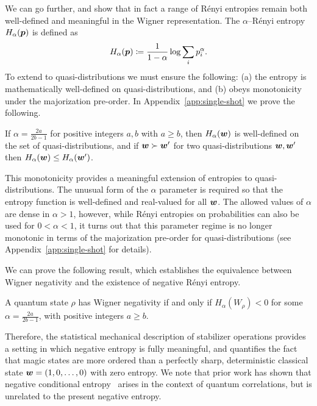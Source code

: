 \documentclass[pra,
aps,
twocolumn,
superscriptaddress,
groupedaddress,
nofootinbib,
reprint
]{revtex4-1}
\begin{document}
We can go further, and show that in fact a range of R\'{e}nyi entropies remain both well-defined and meaningful in the Wigner representation. The $\alpha$--R\'{e}nyi entropy $H_\alpha(\boldsymbol{p})$ is defined as~\cite{renyi_1960}
\begin{equation}
	H_\alpha(\boldsymbol{p}) \coloneqq \frac{1}{1-\alpha} \log \sum_i p_i^\alpha.
\end{equation}
To extend to quasi-distributions we must ensure the following: (a) the entropy is mathematically well-defined on quasi-distributions, and (b) obeys monotonicity under the majorization pre-order. In Appendix~\ref{app:single-shot} we prove the following.
\begin{theorem}\label{thm:HSchur} 
	If $\alpha = \frac{2a}{2b-1}$ for positive integers $a,b$ with $a \geq b$, then $H_\alpha(\boldsymbol{w})$ is well-defined on the set of quasi-distributions, and if $\boldsymbol{w} \succ \boldsymbol{w}'$ for two quasi-distributions $\boldsymbol{w}, \boldsymbol{w}'$ then $H_\alpha (\boldsymbol{w}) \leq H_\alpha(\boldsymbol{w}')$.
\end{theorem}
This monotonicity provides a meaningful extension of entropies to quasi-distributions. The unusual form of the $\alpha$ parameter is required so that the entropy function is well-defined and real-valued for all $\boldsymbol{w}$. The allowed values of $\alpha$ are dense in $\alpha >1$, however, while R\'{e}nyi entropies on probabilities can also be used for $0 < \alpha <1$, it turns out that this parameter regime is no longer monotonic in terms of the majorization pre-order for quasi-distributions (see Appendix~\ref{app:single-shot} for details).

We can prove the following result, which establishes the equivalence between Wigner negativity and the existence of negative R\'{e}nyi entropy.
\begin{theorem}\label{thm:Magic}
	A quantum state $\rho$ has Wigner negativity if and only if $H_\alpha(W_\rho) <0$ for some $\alpha = \frac{2a}{2b-1}$, with positive integers $a \ge b$.
\end{theorem}
Therefore, the statistical mechanical description of stabilizer operations provides a setting in which negative entropy is fully meaningful, and quantifies the fact that magic states are more ordered than a perfectly sharp, deterministic classical state $\boldsymbol{w} = (1,0, \dots , 0)$ with zero entropy. We note that prior work has shown that negative conditional entropy~\cite{rio_thermodynamic_2011} arises in the context of quantum correlations, but is unrelated to the present negative entropy.
\end{document}
